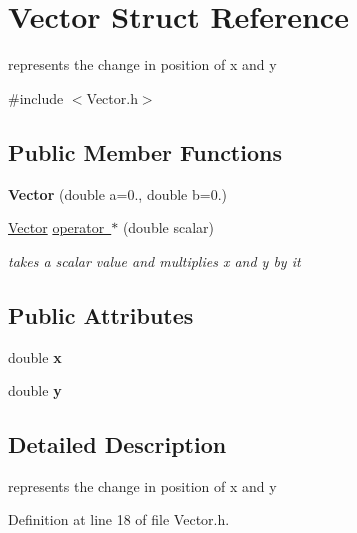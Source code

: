 \hypertarget{struct_vector}{}\section{Vector Struct Reference}
\label{struct_vector}


represents the change in position of x and y  




{\ttfamily \#include $<$Vector.\+h$>$}

\subsection*{Public Member Functions}
\begin{DoxyCompactItemize}
\item 
\mbox{\label{struct_vector_a7aa140c1b483251d16df6d256ad22bf7}} 
{\bfseries Vector} (double a=0., double b=0.)
\item 
\mbox{\hyperlink{struct_vector}{Vector}} \mbox{\hyperlink{struct_vector_a4f5f72401cce567d96b50b95109c9bb3}{operator $\ast$}} (double scalar)
\begin{DoxyCompactList}\small\item\em takes a scalar value and multiplies x and y by it \end{DoxyCompactList}\end{DoxyCompactItemize}
\subsection*{Public Attributes}
\begin{DoxyCompactItemize}
\item 
\mbox{\label{struct_vector_a133722e00601091cb2075219da5da6e4}} 
double {\bfseries x}
\item 
\mbox{\label{struct_vector_a09a21a140718f234eea348d5058cee0b}} 
double {\bfseries y}
\end{DoxyCompactItemize}


\subsection{Detailed Description}
represents the change in position of x and y 

Definition at line 18 of file Vector.\+h.



